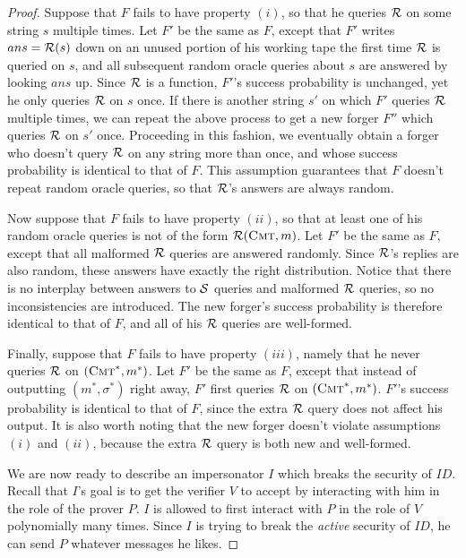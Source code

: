 \documentclass[12pt,twoside]{article}
\begin{document}
\begin{proof}
\medskip\noindent
Suppose that $F$ fails to have property $(i)$, so that he queries $\mathcal{R}$ on 
some string $s$ multiple times. Let $F'$ be the same as $F$, except that $F'$ 
writes $ans = \mathcal{R}(s)$ down on an unused portion of his working tape the first
time $\mathcal{R}$ is queried on $s$, and all subsequent random oracle queries about 
$s$ are answered by looking $ans$ up. Since $\mathcal{R}$ is a function, $F'$'s 
success probability is unchanged, yet he only queries $\mathcal{R}$ on $s$ once. 
If there is another string $s'$ on which $F'$ queries $\mathcal{R}$ multiple times, 
we can repeat the above process to get a new forger $F''$ which queries $\mathcal{R}$
on $s'$ once. Proceeding in this fashion, we eventually obtain a forger 
who doesn't query $\mathcal{R}$ on any string more than once, and whose success 
probability is identical to that of $F$. This assumption guarantees that $F$
doesn't repeat random oracle queries, so that $\mathcal{R}$'s answers are always 
random.

\medskip\noindent
Now suppose that $F$ fails to have property $(ii)$, so that at least one of his 
random oracle queries is not of the form $\mathcal{R}(\textsc{Cmt},m)$. Let $F'$ be 
the same as $F$, except that all malformed $\mathcal{R}$ queries are answered 
randomly. Since $\mathcal{R}$'s replies are also random, these answers have exactly 
the right distribution. Notice that there is no interplay between answers to 
$\mathcal{S}$ queries and malformed $\mathcal{R}$ queries, so no inconsistencies are 
introduced. The new forger's success probability is therefore identical to 
that of $F$, and all of his $\mathcal{R}$ queries are well-formed. 

\medskip\noindent
Finally, suppose that $F$ fails to have property $(iii)$, namely that he never 
queries $\mathcal{R}$ on $(\textsc{Cmt}^*,m^*)$. Let $F'$ be the same as $F$, except
that instead of outputting $(m^*,\sigma^*)$ right away, $F'$ first queries
$\mathcal{R}$ on $(\textsc{Cmt}^*,m^*)$. $F'$'s success probability is 
identical to that of $F$, since the extra $\mathcal{R}$ query does not affect his 
output. It is also worth noting that the new forger doesn't violate
assumptions $(i)$ and $(ii)$, because the extra $\mathcal{R}$ query is both
new and well-formed.

\medskip\noindent
We are now ready to describe an impersonator $I$ which breaks the security of 
$ID$. Recall that $I$'s goal is to get the verifier $V$ to 
accept by interacting with him in the role of the prover $P$. $I$ is allowed
to first interact with $P$ in the role of $V$ polynomially many times. Since 
$I$ is trying to break the \emph{active} security of $ID$, he can send $P$ 
whatever messages he likes.


\end{proof}
\end{document}
